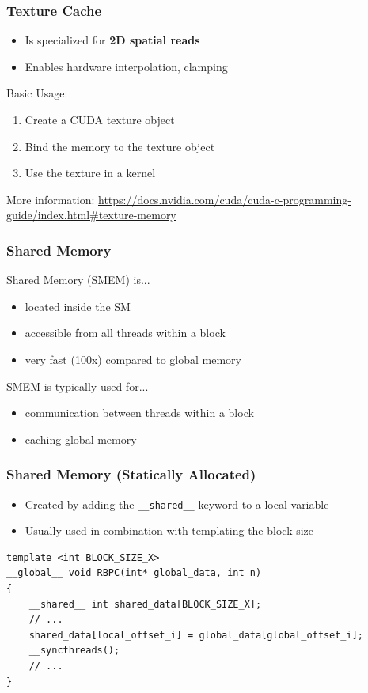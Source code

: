 \documentclass[aspectratio=169,handout]{beamer}
\begin{document}
\begin{frame}[fragile]
\frametitle{Texture Cache}
	\begin{itemize}
		\item Is specialized for \textbf{2D spatial reads}
		\item Enables hardware interpolation, clamping 
	\end{itemize}
	Basic Usage:
\begin{enumerate}
	\item Create a CUDA texture object
	\item Bind the memory to the texture object
	\item Use the texture in a kernel
\end{enumerate}
\vspace{0.2cm}
More information: \url{https://docs.nvidia.com/cuda/cuda-c-programming-guide/index.html#texture-memory}
\end{frame}


\begin{frame}[fragile]
\frametitle{Shared Memory}

Shared Memory (SMEM) is...
\begin{itemize}
	\item located inside the SM
	\item accessible from all threads within a block
	\item very fast (100x) compared to global memory
\end{itemize}
SMEM is typically used for...
\begin{itemize}
	\item communication between threads within a block
	\item caching global memory
\end{itemize}
\end{frame}

\begin{frame}[fragile]
\frametitle{Shared Memory (Statically Allocated)}
\begin{itemize}
	\item Created by adding the \texttt{\_\_shared\_\_} keyword to a local variable
	\item Usually used in combination with templating the block size
\end{itemize}
\begin{lstlisting}
template <int BLOCK_SIZE_X>
__global__ void RBPC(int* global_data, int n)
{
    __shared__ int shared_data[BLOCK_SIZE_X];
    // ...
    shared_data[local_offset_i] = global_data[global_offset_i];
    __syncthreads();
    // ...
}
\end{lstlisting}
\end{frame}
\end{document}
